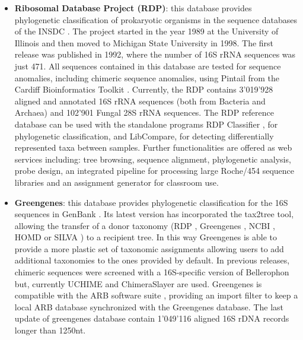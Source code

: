 \begin{itemize}
\item \textbf{Ribosomal Database Project (RDP)}: this database provides phylogenetic classification of prokaryotic organisms in the sequence databases of the INSDC \cite{maidak2001rdp}. The project started in the year 1989 at the University of Illinois and then moved to Michigan State University in 1998. The first release was published in 1992, where the number of 16S rRNA sequences was just 471. All sequences contained in this database are tested for sequence anomalies, including chimeric sequence anomalies, using Pintail from the Cardiff Bioinformatics Toolkit \cite{ashelford2005least}. Currently, the RDP contains  3'019'928 aligned and annotated 16S rRNA sequences (both from Bacteria and Archaea) and 102'901 Fungal 28S rRNA sequences. The RDP reference database can be used with the standalone programs RDP Classifier \cite{wang2007naive}, for phylogenetic classification, and LibCompare, for detecting differentially represented taxa between samples. Further functionalities are offered as web services including: tree browsing, sequence alignment, phylogenetic analysis, probe design, an integrated pipeline for processing large Roche/454 sequence libraries and an assignment generator for classroom use.

\item \textbf{Greengenes}: this database provides phylogenetic classification for the 16S sequences in GenBank \cite{desantis2006greengenes}. Its latest version has incorporated the tax2tree tool, allowing the transfer of a donor taxonomy (RDP \cite{maidak2001rdp}, Greengenes \cite{desantis2006greengenes}, NCBI \cite{tatusova2013refseq}, HOMD \cite{chen2010human} or SILVA \cite{quast2012silva}) to a recipient tree. In this way Greengenes is able to provide a more plastic set of taxonomic assignments allowing users to add additional taxonomies to the ones provided by default. In previous releases, chimeric sequences were screened with a 16S-specific version of Bellerophon \cite{huber2004bellerophon} but, currently UCHIME \cite{edgar2011uchime} and ChimeraSlayer \cite{haas2011chimeric} are used. Greengenes is compatible with the ARB software suite \cite{ludwig2004arb}, providing an import filter to keep a local ARB database synchronized with the Greengenes database. The last update of greengenes database contain 1'049'116 aligned 16S rDNA records longer than 1250nt.


\end{itemize}
